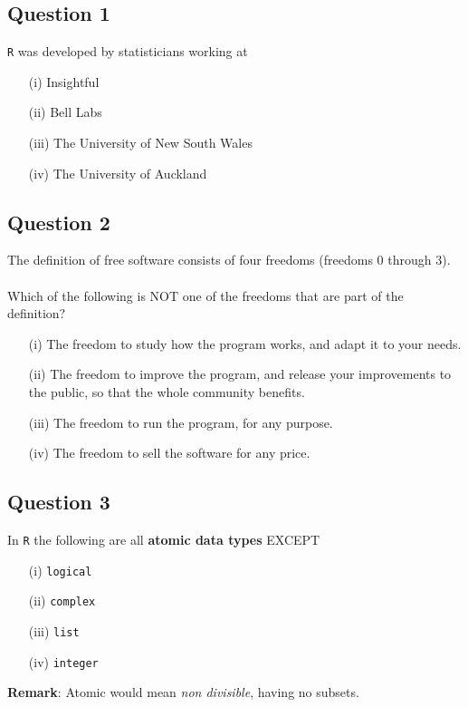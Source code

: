 \documentclass[12pt]{article}
\begin{document}
	

\subsection*{Question 1}
\Large
\texttt{R} was developed by statisticians working at
\begin{itemize}
	\item[(i)] Insightful
	\item[(ii)] Bell Labs
	\item[(iii)] The University of New South Wales
	\item[(iv)] The University of Auckland
\end{itemize}

\newpage
\subsection*{Question 2}
\Large
The definition of free software consists of four freedoms (freedoms 0 through 3). \\ \\Which of the following is NOT one of the freedoms that are part of the definition?
\begin{itemize}
	\item[(i)] The freedom to study how the program works, and adapt it to your needs.
	\item[(ii)] The freedom to improve the program, and release your improvements to the public, so that the whole community benefits.
	\item[(iii)] The freedom to run the program, for any purpose.
	\item[(iv)] The freedom to sell the software for any price.
\end{itemize}

\newpage
\subsection*{Question 3}
\Large
In \texttt{R} the following are all \textbf{atomic data types} EXCEPT
\begin{itemize}
	\item[(i)] \texttt{logical}
	\item[(ii)] \texttt{complex}
	\item[(iii)] \texttt{list}
	\item[(iv)] \texttt{integer}
\end{itemize}
\bigskip
\noindent \textbf{Remark}: Atomic would mean \textit{non divisible}, having no subsets.
\newpage
\end{document}
